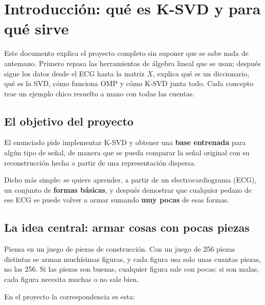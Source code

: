 \documentclass[11pt,letterpaper]{article}
\begin{document}

\portadilla
\newpage


\section{Introducción: qué es K-SVD y para qué sirve}

\begin{quick_sum}
    Este documento explica el proyecto completo sin suponer que se sabe
    nada de antemano. Primero repasa las herramientas de álgebra lineal
    que se usan; después sigue los datos desde el ECG hasta la matriz
    $X$, explica qué es un diccionario, qué es la SVD, cómo funciona OMP
    y cómo K-SVD junta todo. Cada concepto trae un ejemplo chico
    resuelto a mano con todas las cuentas.
\end{quick_sum}

\subsection*{El objetivo del proyecto}

El enunciado pide implementar K-SVD y obtener una \textbf{base
entrenada} para algún tipo de señal, de manera que se pueda comparar la
señal original con su reconstrucción hecha a partir de una
representación dispersa.

Dicho más simple: se quiere aprender, a partir de un electrocardiograma
(ECG), un conjunto de \textbf{formas básicas}, y después demostrar que
cualquier pedazo de ese ECG se puede volver a armar sumando \textbf{muy
pocas} de esas formas.

\subsection*{La idea central: armar cosas con pocas piezas}

Piensa en un juego de piezas de construcción. Con un juego de 256
piezas distintas se arman muchísimas figuras, y cada figura usa solo
unas cuantas piezas, no las 256. Si las piezas son buenas, cualquier
figura sale con pocas; si son malas, cada figura necesita muchas o no
sale bien.

En el proyecto la correspondencia es esta:
\end{document}
